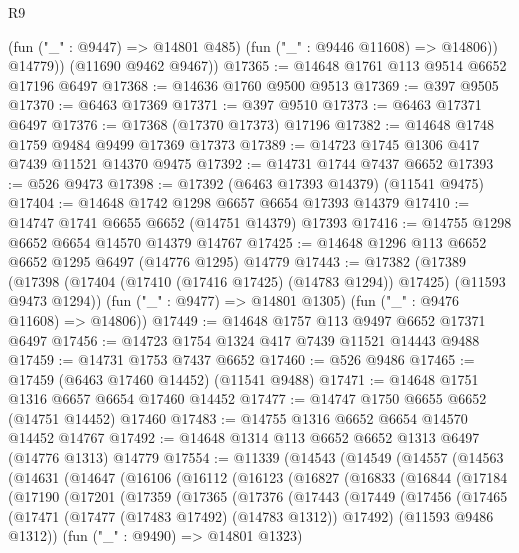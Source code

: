 \begin{lexlean}{R9}
\begin{coremodule}
{{{{{{{{{{{{{{{{{{{{{{{{{{{{{{{{{{{{{{{{{{{{{{{{{{{{{{{{{{{{{{{{{{{{{{{{{{{{{{{{{{{{            (fun ("_" : @9447) => @14801 @485)
            (fun ("_" : @9446 @11608) => @14806))
          @14779))
      (@11690 @9462 @9467))
@17365 := @14648 @1761 @113 @9514 @6652 @17196 @6497
@17368 := @14636 @1760 @9500 @9513
@17369 := @397 @9505
@17370 := @6463 @17369
@17371 := @397 @9510
@17373 := @6463 @17371 @6497
@17376 := @17368 (@17370 @17373) @17196
@17382 := @14648 @1748 @1759 @9484 @9499 @17369 @17373
@17389 := @14723 @1745 @1306 @417 @7439 @11521 @14370 @9475
@17392 := @14731 @1744 @7437 @6652
@17393 := @526 @9473
@17398 := @17392 (@6463 @17393 @14379) (@11541 @9475)
@17404 := @14648 @1742 @1298 @6657 @6654 @17393 @14379
@17410 := @14747 @1741 @6655 @6652 (@14751 @14379) @17393
@17416 := @14755 @1298 @6652 @6654 @14570 @14379 @14767
@17425 := @14648 @1296 @113 @6652 @6652 @1295 @6497 (@14776 @1295) @14779
@17443 := @17382
    (@17389
      (@17398 (@17404 (@17410 (@17416 @17425) (@14783 @1294)) @17425) (@11593 @9473 @1294))
      (fun ("_" : @9477) => @14801 @1305)
      (fun ("_" : @9476 @11608) => @14806))
@17449 := @14648 @1757 @113 @9497 @6652 @17371 @6497
@17456 := @14723 @1754 @1324 @417 @7439 @11521 @14443 @9488
@17459 := @14731 @1753 @7437 @6652
@17460 := @526 @9486
@17465 := @17459 (@6463 @17460 @14452) (@11541 @9488)
@17471 := @14648 @1751 @1316 @6657 @6654 @17460 @14452
@17477 := @14747 @1750 @6655 @6652 (@14751 @14452) @17460
@17483 := @14755 @1316 @6652 @6654 @14570 @14452 @14767
@17492 := @14648 @1314 @113 @6652 @6652 @1313 @6497 (@14776 @1313) @14779
@17554 := @11339
    (@14543
      (@14549
        (@14557
          (@14563
            (@14631
              (@14647
                (@16106
                  (@16112
                    (@16123
                      (@16827
                        (@16833
                          (@16844
                            (@17184
                              (@17190
                                (@17201
                                  (@17359
                                    (@17365
                                      (@17376
                                        (@17443
                                          (@17449
                                            (@17456
                                              (@17465
                                                (@17471
                                                  (@17477 (@17483 @17492) (@14783 @1312))
                                                  @17492)
                                                (@11593 @9486 @1312))
                                              (fun ("_" : @9490) => @14801 @1323)
}}}}}}}}}}}}}}}}}}}}}}}}}}}}}}}}}}}}}}}}}}}}}}}}}}}}}}}}}}}}}}}}}}}}}}}}}}}}}}}}}}}}
\end{coremodule}
\end{lexlean}
